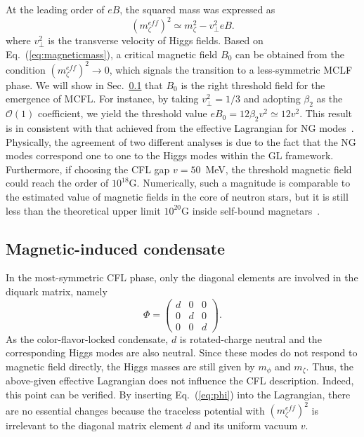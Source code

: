 \documentclass[prd, showpacs,nofootinbib,amsmath,amssymb]{revtex4}
\begin{document}
At the leading order of $eB$, the squared mass was expressed as~\cite{zhang2015magnetic}
\begin{equation}
\label{eq:magneticmass}
(m_\zeta^{eff})^2 \simeq m_\zeta^2 - v_\perp^2eB.
\end{equation}
where $v_\perp^2$ is the transverse velocity of Higgs fields.
Based on Eq.~(\ref{eq:magneticmass}), a critical magnetic field $B_0$ can be obtained from the condition $(m_\zeta^{eff})^2 \rightarrow 0$, which signals the transition to a less-symmetric
MCLF phase. We will show in Sec.~\ref{sssec:2} that $B_0$ is the right threshold field for the emergence of MCFL.
For instance, by taking $v_\perp^2=1/3$ and adopting $\beta_2$ as
the $\mathscr{O}(1)$ coefficient, we yield the threshold value $eB_0 = 12\beta_2 v^2 \simeq 12v^2$.
This result is in consistent with that achieved from the effective Lagrangian for NG
modes~\cite{ferrer2007magnetic}. Physically, the agreement of two different analyses is due to
the fact that the NG modes correspond one to one to the Higgs modes within the GL framework.
Furthermore, if choosing the CFL gap $v = 50$~MeV, the threshold magnetic field could reach the
order of $10^{18}\text{G}$. Numerically, such a magnitude is comparable to the estimated value of
magnetic fields in the core of neutron stars, but it is still less than the theoretical upper
limit $10^{20}\text{G}$ inside self-bound magnetars~\cite{dong2001,lai1991cold}.
\subsection{Magnetic-induced condensate }
\label{sssec:2}

In the most-symmetric CFL phase, only the diagonal elements are involved in the diquark matrix, namely
\begin{equation}
  \label{eq:phi}
  \Phi =
  \begin{pmatrix}
    d & 0 & 0 \\
    0 & d & 0 \\
    0 & 0 & d
    \end{pmatrix}.\end{equation}
As the color-flavor-locked condensate, $d$ is rotated-charge neutral and the corresponding Higgs
modes are also neutral. Since these modes do not respond to magnetic field directly, the Higgs
masses are still given by $m_\phi$ and $m_\zeta$. Thus, the above-given effective Lagrangian does
not influence the CFL description. Indeed, this point can be verified. By inserting Eq.~(\ref{eq:phi})
into the Lagrangian, there are no essential changes because the traceless potential with
$(m_\zeta^{eff})^2$ is irrelevant to the diagonal matrix element $d$ and its uniform vacuum $v$.
\end{document}
